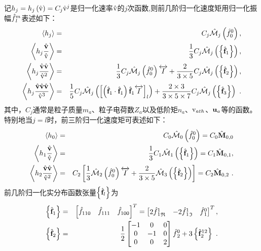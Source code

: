  记$h_j = h_j \left(\hat{\mathrm{v}} \right) = C_j \hat{\mathrm{v}}^j$是归一化速率$\hat{\mathrm{v}}$的$j$次函数,则前几阶归一化速度矩用归一化振幅$\hat{f}{_{l}^m}$表述如下：
  \begin{eqnarray}
      \left < h_j \right> &=& C_j \hat{\mathcal{M}}_j \left( \hat{f}_0^0 \right), \label{Mhg0} \\
      \left < h_j \frac{\hat{\mathbf{v}}}{\hat{\mathrm{v}}} \right> &=&  \frac{1}{3} C_j \hat{\mathcal{M}}_j \left( \left \{\hat{\mathbf{f}}_1 \right\} \right), \label{Mhg1} \\
      \left < h_j \frac{\hat{\mathbf{v}} \hat{\mathbf{v}}}{\hat{\mathrm{v}}^2} \right> &=&  \frac{1}{3} C_j \hat{\mathcal{M}}_j \left( \hat{f}_0^0 \right) \overleftrightarrow{I} + \frac{2}{3 \times 5} C_j \hat{\mathcal{M}}_j \left(\left \{\hat{\mathbf{f}}_2 \right\} \right), \label{Mhg2} \\
      \left < h_j \frac{\hat{\mathbf{v}} \hat{\mathbf{v}} \hat{\mathbf{v}}}{\hat{\mathrm{v}}^3} \right> &=&  \frac{1}{5} C_j \hat{\mathcal{M}}_j \left(\left [\left(\hat{\mathbf{f}}_1 \cdot \hat{\mathbf{f}}_1 \right) \hat{\mathbf{f}}_1 \overleftrightarrow{I} \right]_l \right) + \frac{2 \times 3}{3 \times 5 \times 7} C_j \hat{\mathcal{M}}_j \left(\left \{\hat{\mathbf{f}}_3 \right\} \right) ~. \label{Mhg3}
  \end{eqnarray}
  其中，$C_j$通常是粒子质量$m_a$、粒子电荷数$Z_a$以及低阶矩$n_a$、$\mathrm{v}_{ath}$、$\mathbf{u}_a$等的函数。特别地当$j=l$时，前三阶归一化速度矩可表述如下：
  \begin{eqnarray}
      \left < h_0 \right> &=& C_0 \hat{\mathcal{M}}_0 \left( \hat{f}_0^0 \right) = C_0 \hat{\mathbf{M}}_{0,0} \label{Mhgl0} \\
      \left < h_1 \frac{\hat{\mathbf{v}}}{\hat{\mathrm{v}}} \right> &=&  \frac{1}{3} C_1 \hat{\mathcal{M}}_1 \left( \left \{\hat{\mathbf{f}}_1 \right\} \right) = C_1 \hat{\mathbf{M}}_{0,1}, \label{Mgl1} \\
      \left < h_2 \frac{\hat{\mathbf{v}} \hat{\mathbf{v}}}{\hat{\mathrm{v}}^2} \right> &=&  C_2 \left[\frac{1}{3} \hat{\mathcal{M}}_2 \left( \hat{f}_0^0 \right) \overleftrightarrow{I} + \frac{2}{3 \times 5} \hat{\mathcal{M}}_3 \left(\left \{\hat{\mathbf{f}}_2 \right\} \right) \right] = C_2 \hat{\mathbf{M}}_{0,2} ~. \label{Mgl2}
  \end{eqnarray}
  前几阶归一化实分布函数张量$\left \{\hat{\mathbf{f}}_l \right\}$为
  \begin{eqnarray}
      \left \{\hat{\mathbf{f}}_1 \right \} &=& \left [{\hat{f}}_{110} \quad {\hat{f}}_{111} \quad {\hat{f}}_{100} \right]^T = 
      \begin{bmatrix}
          2 {{\hat{f}}{_1^1}}_{\mathfrak{R}} & -2 {{\hat{f}}{_1^1}}_{\mathfrak{I}} & {\hat{f}}{_1^0}
      \end{bmatrix}^T , \label{fh1I} 
      \\ 
      \left \{\hat{\mathbf{f}}_2 \right \} &=& \frac{1}{2} 
      \begin{bmatrix}
      -1 & 0 & 0 \\
      0 & -1 & 0 \\
      0 & 0 & 2 \\
      \end{bmatrix}
      {\hat{f}}{_2^0} + 3 \left \{\hat{\mathbf{f}}_2^{12} \right \} ~. \label{fh2I}
  \end{eqnarray}
